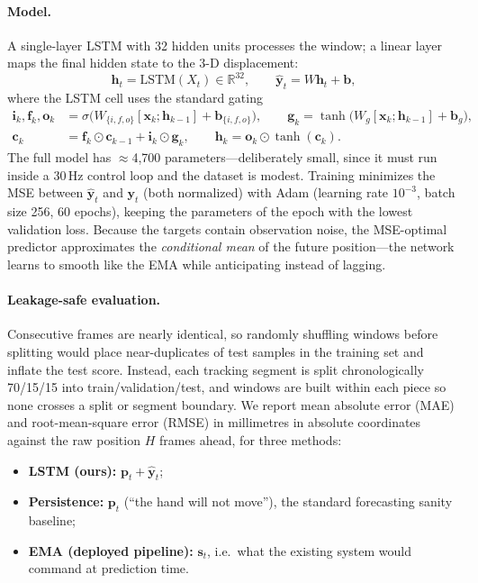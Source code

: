 \documentclass[11pt,a4paper]{article}
\begin{document}
\paragraph{Model.} A single-layer LSTM with 32 hidden units processes the
window; a linear layer maps the final hidden state to the 3-D displacement:
\begin{equation}
  \mathbf{h}_t = \mathrm{LSTM}(X_t) \in \mathbb{R}^{32},
  \qquad
  \hat{\mathbf{y}}_t = W\mathbf{h}_t + \mathbf{b},
\end{equation}
where the LSTM cell uses the standard gating
\begin{equation}
\begin{aligned}
  \mathbf{i}_k,\mathbf{f}_k,\mathbf{o}_k &=
      \sigma\!\bigl(W_{\{i,f,o\}}[\mathbf{x}_k;\mathbf{h}_{k-1}] + \mathbf{b}_{\{i,f,o\}}\bigr),\qquad
  \mathbf{g}_k = \tanh\!\bigl(W_g[\mathbf{x}_k;\mathbf{h}_{k-1}] + \mathbf{b}_g\bigr),\\
  \mathbf{c}_k &= \mathbf{f}_k \odot \mathbf{c}_{k-1} + \mathbf{i}_k \odot \mathbf{g}_k,\qquad
  \mathbf{h}_k = \mathbf{o}_k \odot \tanh(\mathbf{c}_k).
\end{aligned}
\end{equation}
The full model has $\approx$4{,}700 parameters---deliberately small, since it
must run inside a 30\,Hz control loop and the dataset is modest. Training
minimizes the MSE between $\hat{\mathbf{y}}_t$ and $\mathbf{y}_t$ (both
normalized) with Adam (learning rate $10^{-3}$, batch size 256, 60 epochs),
keeping the parameters of the epoch with the lowest validation loss. Because
the targets contain observation noise, the MSE-optimal predictor approximates
the \emph{conditional mean} of the future position---the network learns to
smooth like the EMA while anticipating instead of lagging.

\paragraph{Leakage-safe evaluation.} Consecutive frames are nearly identical,
so randomly shuffling windows before splitting would place near-duplicates of
test samples in the training set and inflate the test score. Instead, each
tracking segment is split chronologically 70/15/15 into train/validation/test,
and windows are built within each piece so none crosses a split or segment
boundary. We report mean absolute error (MAE) and root-mean-square error
(RMSE) in millimetres in absolute coordinates against the raw position $H$
frames ahead, for three methods:
\begin{itemize}
  \item \textbf{LSTM (ours):} $\mathbf{p}_t + \hat{\mathbf{y}}_t$;
  \item \textbf{Persistence:} $\mathbf{p}_t$ (``the hand will not move''), the
        standard forecasting sanity baseline;
  \item \textbf{EMA (deployed pipeline):} $\mathbf{s}_t$, i.e.\ what the
        existing system would command at prediction time.
\end{itemize}
\end{document}
